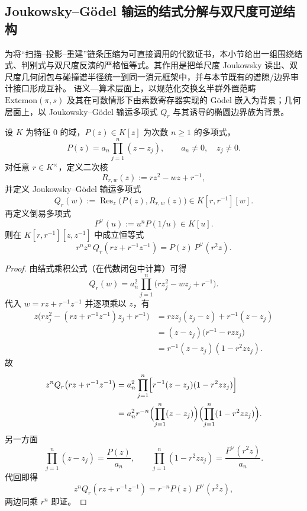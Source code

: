 \subsection{Joukowsky--Gödel 输运的结式分解与双尺度可逆结构}\label{subsec:group-unification-joukowsky-godel}

为将“扫描--投影--重建”链条压缩为可直接调用的代数证书，本小节给出一组围绕结式、判别式与双尺度反演的严格恒等式。其作用是把单尺度 Joukowsky 读出、双尺度几何闭包与碰撞谱半径统一到同一消元框架中，并与本节既有的谱隙/边界审计接口形成互补。
语义—算术层面上，以规范化交换幺半群外置范畴 \(\mathrm{Extcmon}(\pi,s)\) 及其在可数情形下由素数寄存器实现的 Gödel 嵌入为背景；几何层面上，以 Joukowsky--Gödel 输运多项式 \(Q_r\) 与其诱导的椭圆边界族为背景。

\begin{theorem}\label{thm:group-jg-pullback-factorization}
设 \(K\) 为特征 \(0\) 的域，\(P(z)\in K[z]\) 为次数 \(n\ge 1\) 的多项式，
\[
P(z)=a_n\prod_{j=1}^{n}(z-z_j),\qquad a_n\neq 0,\quad z_j\neq 0.
\]
对任意 \(r\in K^\times\)，定义二次核
\[
R_{r,w}(z):=r z^2-w z+r^{-1},
\]
并定义 Joukowsky--Gödel 输运多项式
\[
Q_r(w):=\operatorname{Res}_{z}\!\bigl(P(z),R_{r,w}(z)\bigr)\in K[r,r^{-1}][w].
\]
再定义倒易多项式
\[
P^{\vee}(u):=u^n P(1/u)\in K[u].
\]
则在 \(K[r,r^{-1}][z,z^{-1}]\) 中成立恒等式
\[
\boxed{\;
r^n z^n\,Q_r\!\left(r z+r^{-1}z^{-1}\right)=P(z)\,P^{\vee}(r^2 z).
\;}
\]
\end{theorem}
\begin{proof}
由结式乘积公式（在代数闭包中计算）可得
\[
Q_r(w)=a_n^2\prod_{j=1}^{n}\bigl(r z_j^2-w z_j+r^{-1}\bigr).
\]
代入 \(w=r z+r^{-1}z^{-1}\) 并逐项乘以 \(z\)，有
\[
\begin{aligned}
z\bigl(r z_j^2-(r z+r^{-1}z^{-1})z_j+r^{-1}\bigr)
&=r z z_j(z_j-z)+r^{-1}(z-z_j)\\
&=(z-z_j)\bigl(r^{-1}-r z z_j\bigr)\\
&=r^{-1}(z-z_j)(1-r^2 z z_j).
\end{aligned}
\]
故
\[
\begin{aligned}
z^n Q_r\!\left(r z+r^{-1}z^{-1}\right)
&=a_n^2\prod_{j=1}^{n}\Bigl[r^{-1}(z-z_j)(1-r^2 z z_j)\Bigr]\\
&=a_n^2 r^{-n}\Bigl(\prod_{j=1}^{n}(z-z_j)\Bigr)\Bigl(\prod_{j=1}^{n}(1-r^2 z z_j)\Bigr).
\end{aligned}
\]
另一方面
\[
\prod_{j=1}^{n}(z-z_j)=\frac{P(z)}{a_n},\qquad
\prod_{j=1}^{n}(1-r^2 z z_j)=\frac{P^{\vee}(r^2 z)}{a_n}.
\]
代回即得
\[
z^n Q_r\!\left(r z+r^{-1}z^{-1}\right)=r^{-n}P(z)\,P^{\vee}(r^2 z),
\]
两边同乘 \(r^n\) 即证。
\end{proof}

